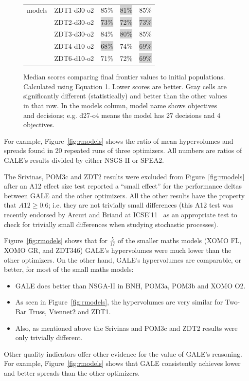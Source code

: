 \documentclass[10pt,journal,compsoc]{IEEEtran}
\newcommand{\bi}{\begin{itemize}}
\newcommand{\ei}{\end{itemize}}
\newcommand{\fig}[1]{Figure~\ref{fig:#1}}
\newenvironment{changed}{\par\color{MyDarkBlue}}{\par}
\begin{document}
\begin{changed}
\begin{figure}[!t]
\begin{tabular}{|r|c|c|c|c|}
models	&	ZDT1-d30-o2	&	85\%	&	\colorbox{lightgray}{81\%}	&	85\%	\\
	&	ZDT2-d30-o2	&	\colorbox{lightgray}{73\%}	&	\colorbox{lightgray}{72\%}	&	\colorbox{lightgray}{73\%}	\\
	&	ZDT3-d30-o2	&	84\%	&	\colorbox{lightgray}{80\%}	&	85\%	\\
	&	ZDT4-d10-o2	&	\colorbox{lightgray}{68\%}	&	74\%	&	\colorbox{lightgray}{69\%}	\\
	&	ZDT6-d10-o2	&	71\%	&	72\%	&	\colorbox{lightgray}{69\%}	\\ \hline
\end{tabular}
\caption{Median scores comparing final frontier values to
initial populations. Calculated using Equation 1. Lower
scores are better. Gray cells are significantly different
(statistically) and better than the other values in that row.
In the models column, model name shows objectives and decisions;
e.g. d27-o4 means
the model has 27 decisions and 4 objectives.  }
\label{fig:whateveryouwannacallme}
\end{figure}

For example, \fig{rmodels} shows the ratio of mean hypervolumes 
and spreads found in 20 repeated runs of three optimizers. All numbers are ratios of GALE's results divided
by either NSGS-II or SPEA2.  

The Srivinas, POM3c and ZDT2 results were
excluded from \fig{rmodels} after an A12 effect size test
reported a ``small effect'' for the performance deltas between GALE and the other optimizers.
All the other results have the property that $\mathit{A12} \ge 0.6$; i.e. they are not trivially small
differences
  (this A12
  test was recently endorsed by Arcuri and
  Briand at ICSE'11~\cite{arcuri11} as an
  appropriate test to check for trivially small
  differences when studying stochastic processes).

\fig{rmodels} shows that for $\frac{5}{17}$
of the smaller maths models (XOMO FL, XOMO GR, and
ZDT346) GALE's hypervolumes were much lower than the
other optimizers.  On the other hand, GALE's
hypervolumes are comparable, or better, for most of
the small maths models: \bi
\item
GALE does better than NSGA-II in BNH, POM3a, POM3b and XOMO
O2.
\item As seen in 
\fig{rmodels}, the hypervolumes are very similar for Two-Bar Truss,
Viennet2 and ZDT1.  
\item
Also, as mentioned
above the Srivinas and POM3c and ZDT2 results were only trivially different.
\ei
Other quality indicators offer other evidence for
the
value of GALE's reasoning. For example, \fig{rmodels} shows that GALE
consistently achieves lower and better spreads than the other optimizers.


\end{changed}
\end{document}
